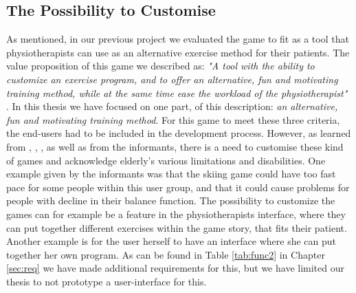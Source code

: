 \subsection{The Possibility to Customise}
As mentioned, in our previous project \cite{project} we evaluated the game to fit as a tool that physiotherapists can use as an alternative exercise method for their patients. The value proposition of this game we described as: \emph{"A tool with the ability to customize an exercise program, and to offer an alternative, fun and motivating training method, while at the same time ease the workload of the physiotherapist"} \cite{project}. In this thesis we have focused on one part, of this description: \emph{an alternative, fun and motivating training method}. For this game to meet these three criteria, the end-users had to be included in the development process. However, as learned from \cite{Billis}, \cite{gregor}, \cite{gerling1}, as well as from the informants, there is a need to customise these kind of games and acknowledge elderly's various limitations and disabilities. One example given by the informants was that the skiing game could have too fast pace for some people within this user group, and that it could cause problems for people with decline in their balance function. The possibility to customize the games can for example be a feature in the physiotherapists interface, where they can put together different exercises within the game story, that fits their patient. Another example is for the user herself to have an interface where she can put together her own program.  As can be found in Table \ref{tab:func2} in Chapter \ref{sec:req} we have made additional requirements for this, but we have limited our thesis to not prototype a user-interface for this. 

